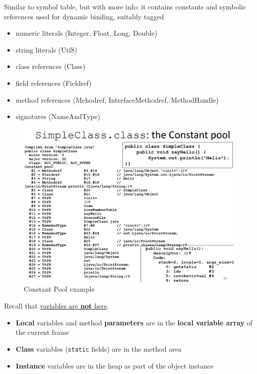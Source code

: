 \begin{paracol}{2}
    
    Similar to symbol table, but with more info: it contains constants and symbolic references used for
    dynamic binding, suitably tagged
    \begin{itemize}
        \item numeric literals (Integer, Float, Long, Double)
        \item string literals (Utf8)
        \item class references (Class)
        \item field references (Fieldref)
        \item method references (Mehodref, InterfaceMethodref, MethodHandle)
        \item signatures (NameAndType)
    \end{itemize}
    
    \switchcolumn

    \begin{figure}[htbp]
        \centering
        \includegraphics[width=0.9\columnwidth]{images/jvm_pool.png}
        \caption{Constant Pool example}
        \label{fig:jvm_pool}
    \end{figure}

\end{paracol}

Recall that \ul{variables are \textbf{not} here}.
\begin{itemize}
    \item \textbf{Local} variables and method \textbf{parameters} are in the \textbf{local variable array} of the current frame
    \item \textbf{Class} variables (\texttt{static} fields) are in the method area 
    \item \textbf{Instance} variables are in the heap as part of the object instance
\end{itemize}


